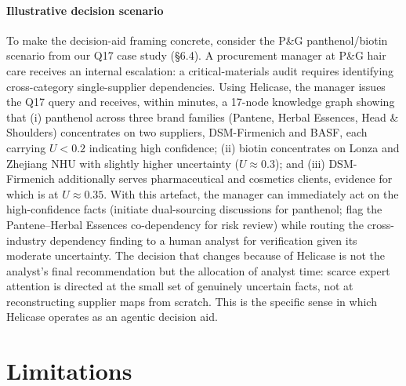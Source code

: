 \documentclass{article}
\begin{document}
\paragraph{Illustrative decision scenario}
To make the decision-aid framing concrete, consider the P\&G panthenol/biotin scenario from our Q17 case study (§6.4). A procurement manager at P\&G hair care receives an internal escalation: a critical-materials audit requires identifying cross-category single-supplier dependencies. Using Helicase, the manager issues the Q17 query and receives, within minutes, a 17-node knowledge graph showing that (i) panthenol across three brand families (Pantene, Herbal Essences, Head \& Shoulders) concentrates on two suppliers, DSM-Firmenich and BASF, each carrying $U < 0.2$ indicating high confidence; (ii) biotin concentrates on Lonza and Zhejiang NHU with slightly higher uncertainty ($U \approx 0.3$); and (iii) DSM-Firmenich additionally serves pharmaceutical and cosmetics clients, evidence for which is at $U \approx 0.35$. With this artefact, the manager can immediately act on the high-confidence facts (initiate dual-sourcing discussions for panthenol; flag the Pantene--Herbal Essences co-dependency for risk review) while routing the cross-industry dependency finding to a human analyst for verification given its moderate uncertainty. The decision that changes because of Helicase is not the analyst's final recommendation but the allocation of analyst time: scarce expert attention is directed at the small set of genuinely uncertain facts, not at reconstructing supplier maps from scratch. This is the specific sense in which Helicase operates as an agentic decision aid.

\section{Limitations}
\end{document}
